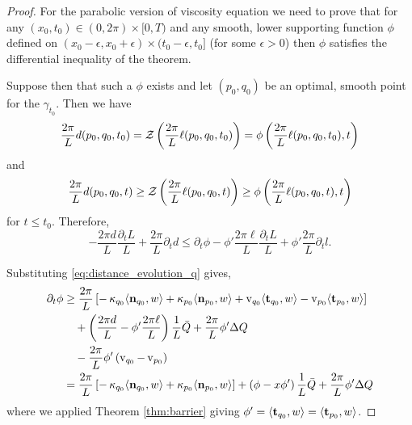 \documentclass[11pt]{amsart}
\begin{document}
\begin{proof}
For the parabolic version of viscosity equation we need to prove that for any $(x_0, t_0) \in (0, 2\pi) \times [0, T)$ and any smooth, lower supporting function $\phi$ defined on $(x_0 -\epsilon, x_0 + \epsilon) \times (t_0 - \epsilon, t_0]$ (for some $\epsilon > 0$) then $\phi$ satisfies the differential inequality of the theorem.

Suppose then that such a $\phi$ exists and let $(p_0, q_0)$ be an optimal, smooth point for the $\gamma_{t_0}$. Then we have
\[
\frac{2\pi}{L} d(p_0, q_0, t_0) = \operatorname{\mathcal{Z}}\left(\frac{2\pi}{L} \ell(p_0, q_0, t_0)\right) = \phi\left(\frac{2\pi}{L} \ell(p_0, q_0, t_0), t\right)
\]
and
\[
\frac{2\pi}{L} d(p_0, q_0, t) \geq \operatorname{\mathcal{Z}}\left(\frac{2\pi}{L} \ell(p_0, q_0, t)\right) \geq \phi\left(\frac{2\pi}{L} \ell(p_0, q_0, t), t\right)
\]
for $t \leq t_0$. Therefore,
\[
- \frac{2\pi d}{L} \frac{\partial_t L}{L} + \frac{2\pi}{L} \partial_t d \leq \partial_t \phi - \phi' \frac{2\pi \ell}{L} \frac{\partial_t L}{L} +\phi' \frac{2\pi}{L} \partial_t l.
\]

Substituting \eqref{eq:distance_evolution_q} gives,
\begin{equation}
\label{eq:time_ineq}
\begin{split}
\partial_t \phi &\geq \frac{2\pi}{L} \left[-\operatorname{\kappa}_{q_0} \langle{\operatorname{\mathbf{n}}_{q_0}},{w}\rangle + \operatorname{\kappa}_{p_0} \langle{\operatorname{\mathbf{n}}_{p_0}},{w}\rangle + \operatorname{v}_{q_0} \langle{\operatorname{\mathbf{t}}_{q_0}},{w}\rangle - \operatorname{v}_{p_0} \langle{\operatorname{\mathbf{t}}_{p_0}},{w}\rangle\right] \\
&\quad + \left(\frac{2\pi d}{L} - \phi' \frac{2\pi \ell}{L}\right) \frac{1}{L} \bar{Q} + \frac{2\pi}{L} \phi' \Delta Q \\
&\quad - \frac{2\pi}{L} \phi' \left(\operatorname{v}_{q_0} - \operatorname{v}_{p_0}\right) \\
&= \frac{2\pi}{L} \left[-\operatorname{\kappa}_{q_0} \langle{\operatorname{\mathbf{n}}_{q_0}},{w}\rangle + \operatorname{\kappa}_{p_0} \langle{\operatorname{\mathbf{n}}_{p_0}},{w}\rangle\right] + \left(\phi - x \phi'\right) \frac{1}{L} \bar{Q} + \frac{2\pi}{L} \phi' \Delta Q
\end{split}
\end{equation}
where we applied Theorem \ref{thm:barrier} giving $\phi' = \langle{\operatorname{\mathbf{t}}_{q_0}},{w}\rangle = \langle{\operatorname{\mathbf{t}}_{p_0}},{w}\rangle$.


\end{proof}
\end{document}
